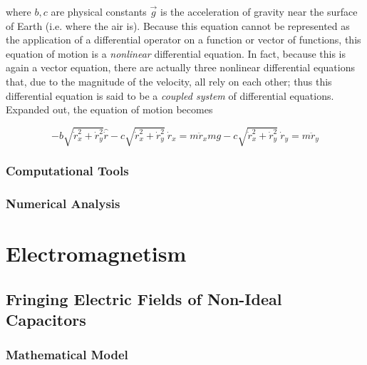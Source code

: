\documentclass{report}
\begin{document}
            where $b,c$ are physical constants $\vec{g}$ is the acceleration of gravity near the surface of Earth (i.e. where the air is).  Because this equation cannot be represented as the application of a differential operator on a function or vector of functions, this equation of motion is a \emph{nonlinear} differential equation.  In fact, because this is again a vector equation, there are actually three nonlinear differential equations that, due to the magnitude of the velocity, all rely on each other; thus this differential equation is said to be a \emph{coupled system} of differential equations.  Expanded out, the equation of motion becomes

            \begin{subequations}
                \begin{equation}
                    - b \sqrt{\dot{r}_x^2 + \dot{r}_y^2} \hat{\dot{r}} - c \sqrt{\dot{r}_x^2 + \dot{r}_y^2} \ \dot{r}_x = m \ddot{r}_x
                \end{equation}
                \begin{equation}
                    m g - c \sqrt{\dot{r}_x^2 + \dot{r}_y^2} \ \dot{r}_y = m \ddot{r}_y
                \end{equation}
            \end{subequations}

        \subsection{Computational Tools}

        \subsection{Numerical Analysis}

\chapter{Electromagnetism}

    \section{Fringing Electric Fields of Non-Ideal Capacitors}

        \subsection{Mathematical Model}
\end{document}
